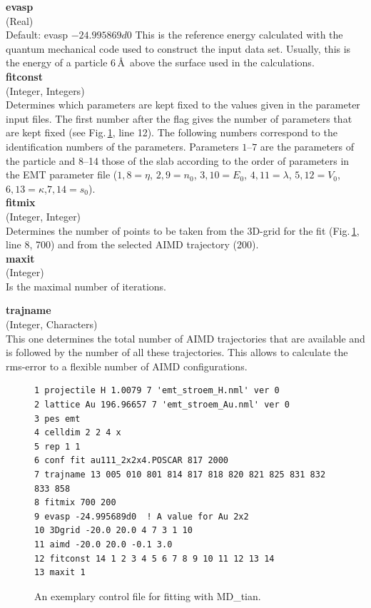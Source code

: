 \documentclass[twoside, 11pt, titlepage, captions=nooneline, a4paper, headsepline]{scrbook}%
\begin{document}
\noindent\textbf{evasp}\\
(Real)\\ 
Default: evasp $-24.995869d0$
This is the reference energy calculated with the quantum mechanical code used to construct the input data set. Usually, this is the energy of a particle 6\,\AA~above the surface used in the calculations.\\

\noindent\textbf{fitconst}\\
(Integer, Integers)\\
Determines which parameters are kept fixed to the values given in the parameter input files. The first number after the flag gives the number of parameters that are kept fixed (see Fig.\,\ref{Fig:mxt:fitting}, line 12). The following numbers correspond to the identification numbers of the parameters. Parameters $1$--$7$ are the parameters of the particle and 8--14 those of the slab according to the order of parameters in the EMT parameter file ($1,8 = \eta$, $2,9 = n_0$, $3,10 = E_0$, $4,11 = \lambda$, $5,12 = V_0$, $6,13 = \kappa$,$7,14 = s_0$).\\

\noindent\textbf{fitmix}\\
(Integer, Integer)\\
Determines the number of points to be taken from the 3D-grid for the fit (Fig.\,\ref{Fig:mxt:fitting}, line 8, 700) and from the selected AIMD trajectory (200).\\

\noindent\textbf{maxit}\\
(Integer)\\
Is the maximal number of iterations.

\noindent\textbf{trajname}\\
(Integer, Characters)\\
This one determines the total number of AIMD trajectories that are available and is followed by the number of all these trajectories. This allows to calculate the rms-error to a flexible number of AIMD configurations.\\


\begin{figure}[t!]
\begin{verbatim}
1 projectile H 1.0079 7 'emt_stroem_H.nml' ver 0
2 lattice Au 196.96657 7 'emt_stroem_Au.nml' ver 0
3 pes emt
4 celldim 2 2 4 x
5 rep 1 1
6 conf fit au111_2x2x4.POSCAR 817 2000
7 trajname 13 005 010 801 814 817 818 820 821 825 831 832 833 858
8 fitmix 700 200
9 evasp -24.995689d0  ! A value for Au 2x2
10 3Dgrid -20.0 20.0 4 7 3 1 10
11 aimd -20.0 20.0 -0.1 3.0
12 fitconst 14 1 2 3 4 5 6 7 8 9 10 11 12 13 14
13 maxit 1 
\end{verbatim}
\caption{\label{Fig:mxt:fitting}An exemplary control file for fitting with MD\_tian.}
\end{figure}
\end{document}
